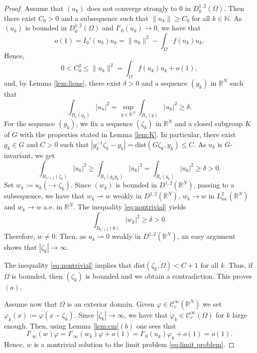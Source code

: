 \documentclass[10pt,letterpaper]{article}
\numberwithin{equation}{section}
\def\rn{\mathbb{R}^N}
\def\n{\mathbb{N}}
\def\rh{\rightharpoonup}
\def\io{\int_{\Omega}}
\def\vp{\varphi}
\def\o{\Omega}
\def\cC{\mathcal{C}}
\def\dist{\mathrm{dist}}
\begin{document}
\begin{proof}
Assume that $(u_k)$ does not converge strongly to $0$ in $D^{1,2}_0(\o)$. Then there exist $C_0>0$ and a subsequence such that $\|u_k\|\geq C_0$ for all $k\in\n$. As $(u_k)$ is bounded in $D^{1,2}_0(\o)$ and $I'_0(u_k)\to 0$, we have that
$$o(1)=I_0'(u_k)u_k= \|u_k\|^2 - \io f(u_k)u_k.$$
Hence,
$$0<C_0^2\leq\|u_k\|^2=\io f(u_k)u_k+o(1),$$
and, by Lemma \ref{lem:lions}, there exist $\delta >0$ and a sequence $(y_k)$ in $\rn$ such that
$$\int_{B_1(y_k)} |u_n|^2 = \sup_{y\in\rn} \int_{B_1(y)} |u_k|^2 \geq\delta.$$
For the sequence $(y_k)$, we fix a sequence $(\zeta_k)$ in $\rn$ and a closed subgroup $K$ of $G$ with the properties stated in Lemma \ref{lem:K}. In particular, there exist $g_k\in G$ and $C>0$ such that $|g_k^{-1}\zeta_k-y_k|=\mathrm{dist}(G\zeta_k,y_k)\leq C$. As $u_k$ is $G$-invariant, we get
\begin{equation}\label{eq:nontrivial}
\int_{B_{C+1}(\zeta_k)} |u_k|^{2} \geq \int_{B_1(g_k y_k)} |u_k|^{2} = \int_{B_1(y_k)} |u_k|^{2}\geq\delta>0.
\end{equation}
Set $w_k := u_k(\cdot + \zeta_k)$. Since $(w_k)$ is bounded in $D^{1,2}(\rn)$, passing to a subsequence, we have that
$w_k\rh w$ weakly in $D^{1,2}(\rn)$, $w_k\to w$ in $L^{2}_{\mathrm{loc}}(\rn)$ and $w_k\to w$ a.e. in $\rn$.
The inequality \eqref{eq:nontrivial} yields
$$\int_{B_{C+1}(0)} |w_k|^{2} \geq \delta>0.$$
Therefore, $w\neq 0$. Then, as $u_k \rh 0$ weakly in $D^{1,2}(\rn)$, an easy argument shows that $|\zeta_k|\to\infty$.

The inequality \eqref{eq:nontrivial} implies that $\dist(\zeta_k,\o)<C+1$ for all $k$. Thus, if $\o$ is bounded, then $(\zeta_k)$ is bounded and we obtain a contradiction. This proves $(a)$.

Assume now that $\o$ is an exterior domain. Given $\vp\in\cC^\infty_c(\rn)$ we set $\vp_k(x):=\vp(x-\zeta_k)$. Since $|\zeta_k|\to\infty$, we have that $\vp_k\in \cC^\infty_c(\o)$ for $k$ large enough. Then, using Lemma \ref{lem:cm}$(b)$ one sees that
$$I'_\infty(w)\vp=I'_\infty(w_k)\vp+o(1)=I'_0(u_k)\vp_k+o(1)=o(1).$$
Hence, $w$ is a nontrivial solution to the limit problem \eqref{eq:limit problem}.


\end{proof}
\end{document}
